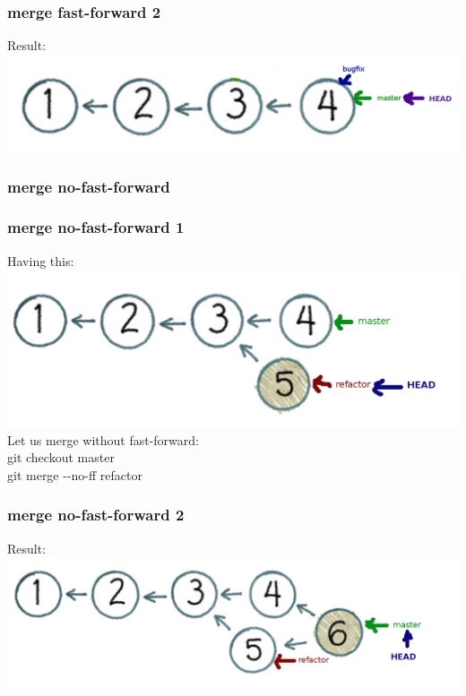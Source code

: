 \documentclass{beamer}
\begin{document}
		\begin{frame}
			\frametitle{merge fast-forward 2}
        Result: \\
				\includegraphics[scale=0.3]{images/merge_ff2}
		\end{frame}

		\subsubsection{merge no-fast-forward}
		\begin{frame}
			\frametitle{merge no-fast-forward 1}
        Having this: \\
				\includegraphics[scale=0.25]{images/merge_noff1}\\
        Let us merge without fast-forward: \\
        git checkout master \\
        git merge -{}-no-ff refactor \\
		\end{frame}

		\begin{frame}
			\frametitle{merge no-fast-forward 2}
        Result: \\
				\includegraphics[scale=0.25]{images/merge_noff2}
		\end{frame}
\end{document}
